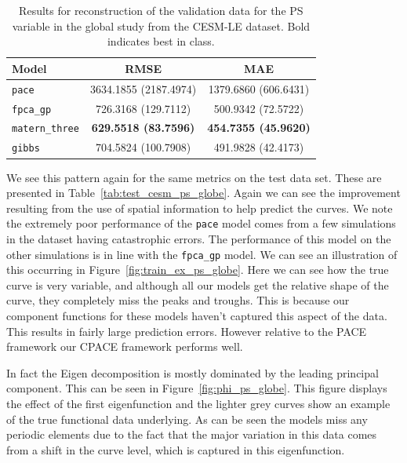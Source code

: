 \begin{table}
	\caption[Results for PS variable on validation data in the Global study]{Results for reconstruction of the validation data for the PS variable in the global study from the CESM-LE dataset. Bold indicates best in class. }
	\centering
	\label{tab:train_cesm_ps_globe}
	\begin{tabular}{lcc}
		\toprule
		\textbf{Model} & \textbf{RMSE} & \textbf{MAE} \\
		\midrule
		\verb*|pace| & 3634.1855 (2187.4974) & 1379.6860 (606.6431) \\
		\verb*|fpca_gp| & 726.3168 (129.7112)& 500.9342	(72.5722)\\
		\verb*|matern_three| & \textbf{629.5518	(83.7596)}& \textbf{454.7355	(45.9620)}\\
		\verb*|gibbs| & 704.5824 (100.7908) & 491.9828 (42.4173)\\
		\bottomrule
	\end{tabular}
\end{table}

We see this pattern again for the same metrics on the test data set.
These are presented in Table~\ref{tab:test_cesm_ps_globe}.
Again we can see the improvement resulting from the use of spatial information to help predict the curves.
We note the extremely poor performance of the \verb*|pace| model comes from a few simulations in the dataset having catastrophic errors.
The performance of this model on the other simulations is in line with the \verb*|fpca_gp| model.
We can see an illustration of this occurring in Figure~\ref{fig:train_ex_ps_globe}. 
Here we can see how the true curve is very variable, and although all our models get the relative shape of the curve, they completely miss the peaks and troughs.
This is because our component functions for these models haven't captured this aspect of the data.
This results in fairly large prediction errors.
However relative to the PACE framework our CPACE framework performs well.

In fact the Eigen decomposition is mostly dominated by the leading principal component.
This can be seen in Figure~\ref{fig:phi_ps_globe}.
This figure displays the effect of the first eigenfunction and the lighter grey curves show an example of the true functional data underlying.
As can be seen the models miss any periodic elements due to the fact that the major variation in this data comes from a shift in the curve level, which is captured in this eigenfunction. 


